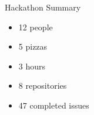 \begin{frame}{Hackathon Summary}
  \begin{itemize}
    \item 12 people
    \item 5 pizzas
    \item 3 hours
    \item 8 repositories
    \item 47 completed issues
  \end{itemize}
\end{frame}
